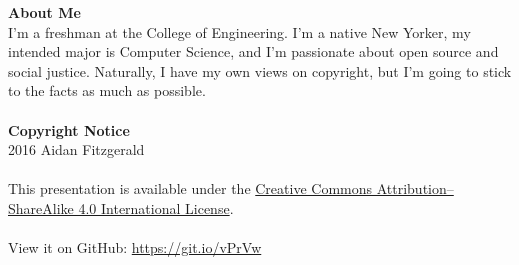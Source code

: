\begin{frame}
  \textbf{About Me}\\
  I'm a freshman at the College of Engineering. I'm a native New Yorker,
  my intended major is Computer Science, and I'm passionate about open source
  and social justice. Naturally, I have my own views on copyright, but I'm going
  to stick to the facts as much as possible.
  \\~\\
  \textbf{Copyright Notice}\\
  \textcopyright{} 2016 Aidan Fitzgerald
  \\~\\
  This presentation is available under the \href{https://creativecommons.org/licenses/by-sa/4.0/}{Creative
  Commons Attribution--ShareAlike 4.0 International License}.
  \\~\\
  View it on GitHub: \url{https://git.io/vPrVw}

\end{frame}
